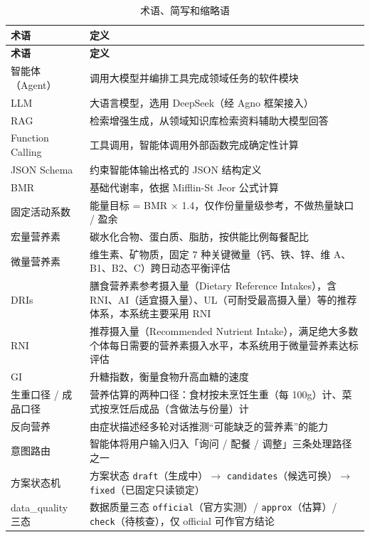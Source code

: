 \documentclass[12pt,a4paper]{ctexart}
\begin{document}
\begin{xltabular}{\linewidth}{p{3.5cm}L}
\caption{术语、简写和缩略语} \\
\toprule
\textbf{术语} & \textbf{定义} \\
\midrule
\endfirsthead
\toprule
\textbf{术语} & \textbf{定义} \\
\midrule
\endhead
智能体（Agent） & 调用大模型并编排工具完成领域任务的软件模块 \\
LLM & 大语言模型，选用 DeepSeek（经 Agno 框架接入） \\
RAG & 检索增强生成，从领域知识库检索资料辅助大模型回答 \\
Function Calling & 工具调用，智能体调用外部函数完成确定性计算 \\
JSON Schema & 约束智能体输出格式的 JSON 结构定义 \\
BMR & 基础代谢率，依据 Mifflin-St Jeor 公式计算 \\
固定活动系数 & 能量目标 = BMR $\times$ 1.4，仅作份量量级参考，不做热量缺口 / 盈余 \\
宏量营养素 & 碳水化合物、蛋白质、脂肪，按供能比例每餐配比 \\
微量营养素 & 维生素、矿物质，固定 7 种关键微量（钙、铁、锌、维 A、B1、B2、C）跨日动态平衡评估 \\
DRIs & 膳食营养素参考摄入量（Dietary Reference Intakes），含 RNI、AI（适宜摄入量）、UL（可耐受最高摄入量）等的推荐体系，本系统主要采用 RNI \\
RNI & 推荐摄入量（Recommended Nutrient Intake），满足绝大多数个体每日需要的营养素摄入水平，本系统用于微量营养素达标评估 \\
GI & 升糖指数，衡量食物升高血糖的速度 \\
生重口径 / \newline 成品口径 & 营养估算的两种口径：食材按未烹饪生重（每 100g）计、菜式按烹饪后成品（含做法与份量）计 \\
反向营养 & 由症状描述经多轮对话推测“可能缺乏的营养素”的能力 \\
意图路由 & 智能体将用户输入归入「询问 / 配餐 / 调整」三条处理路径之一 \\
方案状态机 & 方案状态 \texttt{draft}（生成中）$\rightarrow$ \texttt{candidates}（候选可换）$\rightarrow$ \texttt{fixed}（已固定只读锁定） \\
data\_quality 三态 & 数据质量三态 \texttt{official}（官方实测）/ \texttt{approx}（估算）/ \texttt{check}（待核查），仅 official 可作官方结论 \\
\bottomrule
\end{xltabular}
\end{document}
